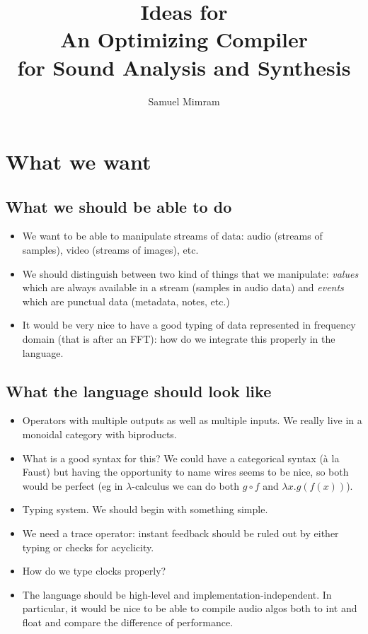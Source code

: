 \documentclass{article}
\title{Ideas for\\An Optimizing Compiler\\for Sound Analysis and Synthesis}
\author{Samuel Mimram}
\begin{document}
\maketitle

\section{What we want}
\subsection{What we should be able to do}
\begin{itemize}
\item We want to be able to manipulate streams of data: audio (streams of
  samples), video (streams of images), etc.
\item We should distinguish between two kind of things that we manipulate:
  \emph{values} which are always available in a stream (samples in audio data)
  and \emph{events} which are punctual data (metadata, notes, etc.)
\item It would be very nice to have a good typing of data represented in
  frequency domain (that is after an FFT): how do we integrate this properly in
  the language.
\end{itemize}

\subsection{What the language should look like}
\begin{itemize}
\item Operators with multiple outputs as well as multiple inputs. We really live
  in a monoidal category with biproducts.
\item What is a good syntax for this? We could have a categorical syntax (à la
  Faust) but having the opportunity to name wires seems to be nice, so both
  would be perfect (eg in $\lambda$-calculus we can do both $g\circ f$ and
  $\lambda x.g(f(x))$).
\item Typing system. We should begin with something simple.
\item We need a trace operator: instant feedback should be ruled out by either
  typing or checks for acyclicity.
\item How do we type clocks properly?
\item The language should be high-level and implementation-independent. In
  particular, it would be nice to be able to compile audio algos both to int and
  float and compare the difference of performance.
\end{itemize}
\end{document}
